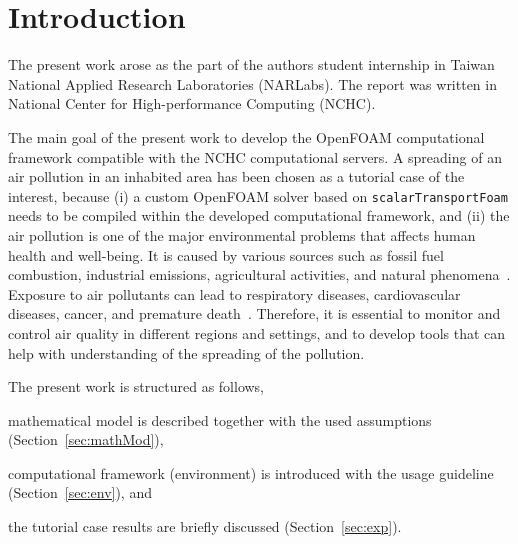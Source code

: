 \cleardoublepage
{}
\section{Introduction}
\label{sec:intro}

The present work arose as the part of the authors student internship in Taiwan National Applied Research Laboratories (NARLabs). The report was written in National Center for High-performance Computing (NCHC). 

The main goal of the present work to develop the OpenFOAM computational framework compatible with the NCHC computational servers. A spreading of an air pollution in an inhabited area has been chosen as a tutorial case of the interest, because (i) a custom OpenFOAM solver based on \texttt{scalarTransportFoam} needs to be compiled within the developed computational framework, and (ii) the air pollution is one of the major environmental problems that affects human health and well-being. It is caused by various sources such as fossil fuel combustion, industrial emissions, agricultural activities, and natural phenomena~\cite{chen14}. Exposure to air pollutants can lead to respiratory diseases, cardiovascular diseases, cancer, and premature death~\cite{cohen17}. Therefore, it is essential to monitor and control air quality in different regions and settings, and to develop tools that can help with understanding of the spreading of the pollution. 

The present work is structured as follows, 
\begin{inparaenum}[(i)]
    \item mathematical model is described together with the used assumptions (Section~\ref{sec:mathMod}), 
    \item computational framework (environment) is introduced with the usage guideline (Section~\ref{sec:env}), and
    \item the tutorial case results are briefly discussed (Section~\ref{sec:exp}).
\end{inparaenum}

